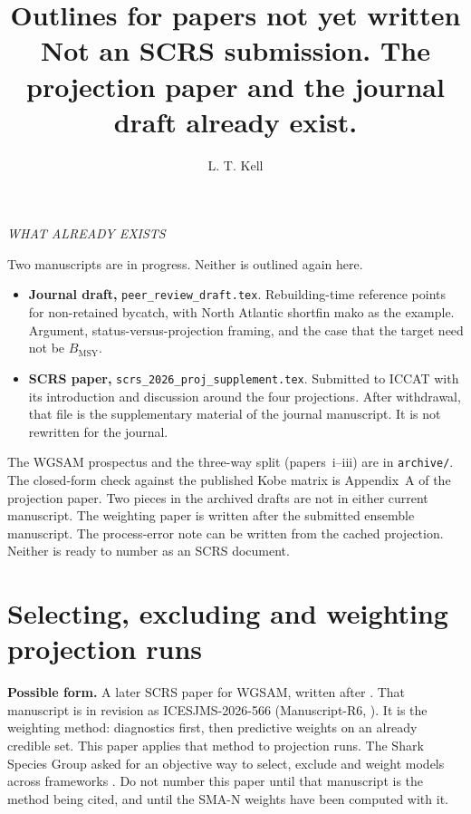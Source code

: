 \documentclass[11pt,a4paper]{article}
\title{\textbf{Outlines for papers not yet written}\\[0.5em]
\large Not an SCRS submission. The projection paper and the journal draft
already exist.}
\author[1]{L. T. Kell}
\affil[1]{Centre for Environmental Policy, Imperial College London, London, United Kingdom.\\
\texttt{laurie@seaplusplus.co.uk}}
\begin{document}
\maketitle

\begin{center}\textit{WHAT ALREADY EXISTS}\end{center}

Two manuscripts are in progress. Neither is outlined again here.

\begin{itemize}[leftmargin=*]
  \item \textbf{Journal draft,} \texttt{peer\_review\_draft.tex}.
    Rebuilding-time reference points for non-retained bycatch, with North
    Atlantic shortfin mako as the example. Argument, status-versus-projection
    framing, and the case that the target need not be $B_{\mathrm{MSY}}$.
  \item \textbf{SCRS paper,} \texttt{scrs\_2026\_proj\_supplement.tex}.
    Submitted to ICCAT with its introduction and discussion around the four
    projections. After withdrawal, that file is the supplementary material
    of the journal manuscript. It is not rewritten for the journal.
\end{itemize}

The WGSAM prospectus and the three-way split (papers~i--iii) are in
\texttt{archive/}. The closed-form check against the published Kobe matrix is
Appendix~A of the projection paper. Two pieces in the archived drafts are
not in either current manuscript. The weighting paper is written after the
submitted ensemble manuscript. The process-error note can be written from
the cached projection. Neither is ready to number as an SCRS document.

\section{Selecting, excluding and weighting projection runs}

\textbf{Possible form.} A later SCRS paper for WGSAM, written after
\citet{WangEnsembleR5}. That manuscript is in revision as ICESJMS-2026-566
(Manuscript-R6, ). It is the
weighting method: diagnostics first, then predictive weights on an already
credible set. This paper applies that method to projection runs. The Shark
Species Group asked for an objective way to select, exclude and weight
models across frameworks \citep{SharkWG2026}. Do not number this paper until
that manuscript is the method being cited, and until the SMA-N weights have
been computed with it.
\end{document}
